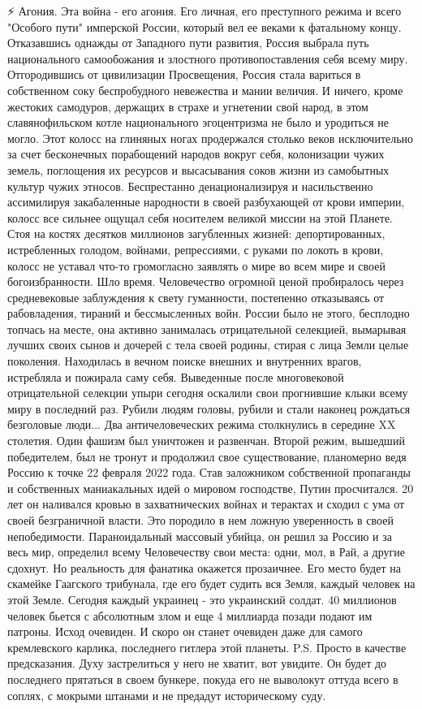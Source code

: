 ⚡️ Агония.
Эта война - его агония. Его личная, его преступного режима и всего "Особого пути" имперской России, который вел ее веками к фатальному концу.
Отказавшись однажды от Западного пути развития, Россия выбрала путь национального самообожания и злостного противопоставления себя всему миру. Отгородившись от цивилизации Просвещения, Россия стала вариться в собственном соку беспробудного невежества и мании величия. И ничего, кроме жестоких самодуров, держащих в страхе и угнетении свой народ, в этом славянофильском котле национального эгоцентризма не было и уродиться не могло.
Этот колосс на глиняных ногах продержался столько веков исключительно за счет бесконечных порабощений народов вокруг себя, колонизации чужих земель, поглощения их ресурсов и высасывания соков жизни из самобытных культур чужих этносов. Беспрестанно денационализируя и насильственно ассимилируя закабаленные народности в своей разбухающей от крови империи, колосс все сильнее ощущал себя носителем великой миссии на этой Планете. Стоя на костях десятков миллионов загубленных жизней: депортированных, истребленных голодом, войнами, репрессиями, с руками по локоть в крови, колосс не уставал что-то громогласно заявлять о мире во всем мире и своей богоизбранности.
Шло время. Человечество огромной ценой пробиралось через средневековые заблуждения к свету гуманности, постепенно отказываясь от рабовладения, тираний и бессмысленных войн. России было не этого, бесплодно топчась на месте, она активно занималась отрицательной селекцией, вымарывая лучших своих сынов и дочерей с тела своей родины, стирая с лица Земли целые поколения. Находилась в вечном поиске внешних и внутренних врагов, истребляла и пожирала саму себя. Выведенные после многовековой отрицательной селекции упыри сегодня оскалили свои прогнившие клыки всему миру в последний раз. Рубили людям головы, рубили и стали наконец рождаться безголовые люди...
Два античеловеческих режима столкнулись в середине XX столетия. Один фашизм был уничтожен и развенчан. Второй режим, вышедший победителем, был не тронут и продолжил свое существование, планомерно ведя Россию к точке 22 февраля 2022 года.
Став заложником собственной пропаганды и собственных маниакальных идей о мировом господстве, Путин просчитался.
20 лет он наливался кровью в захватнических войнах и терактах и сходил с ума от своей безграничной власти. Это породило в нем ложную уверенность в своей непобедимости. Параноидальный массовый убийца, он решил за Россию и за весь мир, определил всему Человечеству свои места: одни, мол, в Рай, а другие сдохнут.
Но реальность для фанатика окажется прозаичнее. Его место будет на скамейке Гаагского трибунала, где его будет судить вся Земля, каждый человек на этой Земле.
Сегодня каждый украинец - это украинский солдат. 40 миллионов человек бьется с абсолютным злом и еще 4 миллиарда позади подают им патроны. Исход очевиден. И скоро он станет очевиден даже для самого кремлевского карлика, последнего гитлера этой планеты.
P.S. Просто в качестве предсказания. Духу застрелиться у него не хватит, вот увидите. Он будет до последнего прятаться в своем бункере, покуда его не выволокут оттуда всего в соплях, с мокрыми штанами и не предадут историческому суду.

